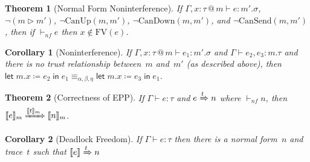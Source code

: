 \documentclass{article}
\makeatletter
\newtheorem{thm}{Theorem}
\newtheorem{cor}{Corollary}
\theoremstyle{definition}
\newcommand{\letl}[4]{\textsf{let}\;#1.#2 \mathrel{\coloneqq} #3 \mathrel{\textsf{in}} #4}
\newcommand{\at}{\ensuremath{\mathrel{@}}}
\newcommand{\reps}[2]{#1 \mathrel{\vartriangleright} #2}
\newcommand{\cansend}[2]{\text{CanSend}(#1, #2)}
\newcommand{\candown}[2]{\text{CanDown}(#1, #2)}
\newcommand{\canup}[2]{\text{CanUp}(#1, #2)}
\makeatother
\begin{document}
\begin{thm}[Normal Form Noninterference]
  If\/ $\Gamma, x : \tau \at m \vdash e : m'.\sigma$, $\lnot (\reps{m}{m'})$, $\lnot\canup{m}{m'}$, $\lnot\candown{m}{m'}$, and $\lnot\cansend{m}{m'}$, then if\/ $\vdash_{nf} e$ then $x \not\in \text{FV}(e)$.
\end{thm}

\begin{cor}[Noninterference]
  If\/ $\Gamma, x : \tau \at m \vdash e_1 : m'.\sigma$ and $\Gamma \vdash e_2, e_3 : m.\tau$ and there is no trust relationship between~$m$ and~$m'$ (as described above), then $\letl{m}{x}{e_2}{e_1} \equiv_{\alpha, \beta, \eta} \letl{m}{x}{e_3}{e_1}$.
\end{cor}

\begin{thm}[Correctness of EPP]
  If\/ $\Gamma \vdash e : \tau$ and $e \xRightarrow{t} n$ where\/ $\vdash_{nf} n$, then $\llbracket e \rrbracket_m \xRightarrow{\llbracket t \rrbracket_m} \llbracket n \rrbracket_m$.
\end{thm}

\begin{cor}[Deadlock Freedom]
  If\/ $\Gamma \vdash e : \tau$ then there is a normal form~$n$ and trace~$t$ such that $\llbracket e \rrbracket \xRightarrow{t} n$
\end{cor}
\end{document}

